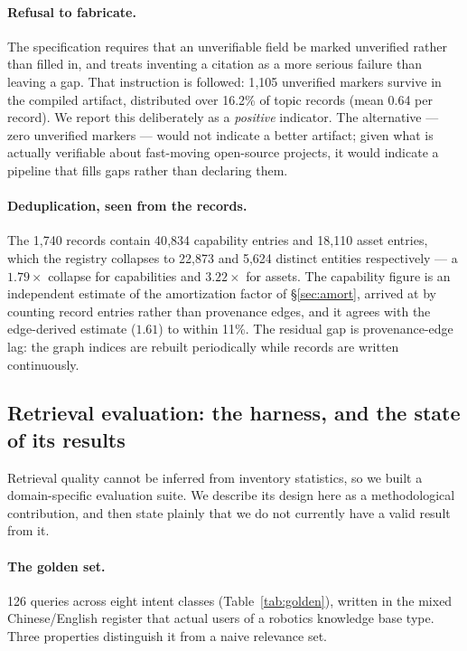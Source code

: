 \documentclass[10pt,a4paper]{article}
\begin{document}
\paragraph{Refusal to fabricate.} The specification requires that an unverifiable
field be marked unverified rather than filled in, and treats inventing a citation
as a more serious failure than leaving a gap. That instruction is followed:
1{,}105 unverified markers survive in the compiled artifact, distributed over
16.2\% of topic records (mean 0.64 per record). We report this deliberately as a
\emph{positive} indicator. The alternative --- zero unverified markers --- would
not indicate a better artifact; given what is actually verifiable about
fast-moving open-source projects, it would indicate a pipeline that fills gaps
rather than declaring them.

\paragraph{Deduplication, seen from the records.} The 1{,}740 records contain
40{,}834 capability entries and 18{,}110 asset entries, which the registry
collapses to 22{,}873 and 5{,}624 distinct entities respectively --- a
$1.79\times$ collapse for capabilities and $3.22\times$ for assets. The
capability figure is an independent estimate of the amortization factor of
\S\ref{sec:amort}, arrived at by counting record entries rather than provenance
edges, and it agrees with the edge-derived estimate ($1.61$) to within 11\%. The
residual gap is provenance-edge lag: the graph indices are rebuilt periodically
while records are written continuously.

\subsection{Retrieval evaluation: the harness, and the state of its results}
\label{sec:golden}

Retrieval quality cannot be inferred from inventory statistics, so we built a
domain-specific evaluation suite. We describe its design here as a methodological
contribution, and then state plainly that we do not currently have a valid result
from it.

\paragraph{The golden set.} 126 queries across eight intent classes
(Table~\ref{tab:golden}), written in the mixed Chinese/English register that
actual users of a robotics knowledge base type. Three properties distinguish it
from a naive relevance set.
\end{document}
